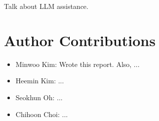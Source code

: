 \begin{acknowledgments}
Talk about LLM assistance.
\end{acknowledgments}

\appendix

\section{Author Contributions}
\begin{itemize}
    \item Minwoo Kim: Wrote this report. Also, ...
    \item Heemin Kim: ...
    \item Seokhun Oh: ...
    \item Chihoon Choi: ...
\end{itemize}




%

